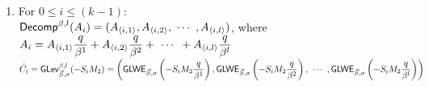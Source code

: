\begin{myproof}
\begin{enumerate}
Therefore: \\
$\langle \textsf{Decomp}^{\beta, l}(B), \bar{C_k} \rangle$\\
$= B_1 \cdot \textsf{GLWE}_{\vec{S}, \sigma} \left (M_{2}\dfrac{q}{\beta^1} \right ) + B_2 \cdot \textsf{GLWE}_{\vec{S}, \sigma} \left (M_{2}\dfrac{q}{\beta^2} \right ) + \gap{$\cdots$} + B_l \cdot \textsf{GLWE}_{\vec{S}, \sigma} \left (M_{2}\dfrac{q}{\beta^l}\right)$ \\
$= \textsf{GLWE}_{\vec{S}, \sigma} \left (B_1M_{2}\dfrac{q}{\beta^1} \right ) + \textsf{GLWE}_{\vec{S}, \sigma} \left (B_2M_{2}\dfrac{q}{\beta^2} \right ) + \gap{$\cdots$} + \textsf{GLWE}_{\vec{S}, \sigma} \left (B_lM_{2}\dfrac{q}{\beta^l}\right)$ \textcolor{red}{ $\rhd$ from \autoref{sec:glwe-mult-plain}} \\
$= \textsf{GLWE}_{\vec{S}, \sigma} \left (B_1M_{2}\dfrac{q}{\beta^1} + B_2M_{2}\dfrac{q}{\beta^2} + \gap{$\cdots$} + B_lM_{2}\dfrac{q}{\beta^l}\right)$ \textcolor{red}{ $\rhd$ from \autoref{sec:glwe-add-cipher}}\\
$= \textsf{GLWE}_{\vec{S}, \sigma} \left (M_{2} \cdot \left ( B_1\dfrac{q}{\beta^1} + B_2\dfrac{q}{\beta^2} + \gap{$\cdots$} + B_l\dfrac{q}{\beta^l} \right)\right)$ \\
$= \textsf{GLWE}_{\vec{S}, \sigma} (M_{2}B)$ \textcolor{red}{ $\rhd$ from \autoref{subsec:poly-decomp}}
\item For $0 \leq i \leq (k - 1)$: \\
$\textsf{Decomp}^{\beta, l}(A_i) = (A_{\langle i, 1 \rangle}, A_{\langle i, 2 \rangle}, \text{ } \text{$\cdots$} \text{ }, A_{\langle i, l \rangle})$, where $A_i = A_{\langle i, 1 \rangle}\dfrac{q}{\beta^1} + A_{\langle i, 2 \rangle}\dfrac{q}{\beta^2} + \text{ } \text{$\cdots$} \text{ } + A_{\langle i, l \rangle}\dfrac{q}{\beta^l}$ \\
$\bar{C_i} =  \textsf{GLev}_{\vec{S}, \sigma}^{\beta, l}(-S_iM_2) = \left(\textsf{GLWE}_{\vec{S}, \sigma}\left(-S_iM_2\dfrac{q}{\beta^1}\right), \textsf{GLWE}_{\vec{S}, \sigma}\left(-S_iM_2\dfrac{q}{\beta^2}\right), \text{ } \text{$\cdots$} \text{ }, \textsf{GLWE}_{\vec{S}, \sigma}\left(-S_iM_2\dfrac{q}{\beta^l}\right) \right)$ \\


\end{enumerate}
\end{myproof}
